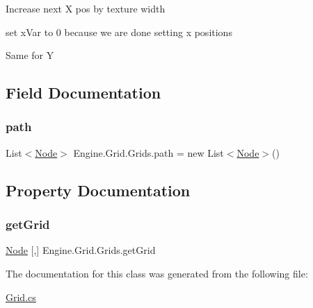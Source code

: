 Increase next X pos by texture width

set x\+Var to 0 because we are done setting x positions

Same for Y 

\subsection{Field Documentation}
\mbox{\label{a00406_ad9776283305f0c420d4a544d418a7c40}} 
\subsubsection{\texorpdfstring{path}{path}}
{\footnotesize\ttfamily List$<$\hyperlink{a00414}{Node}$>$ Engine.\+Grid.\+Grids.\+path = new List$<$\hyperlink{a00414}{Node}$>$()}



\subsection{Property Documentation}
\mbox{\label{a00406_a272de0996ab650f3dde958644d26b032}} 
\subsubsection{\texorpdfstring{get\+Grid}{getGrid}}
{\footnotesize\ttfamily \hyperlink{a00414}{Node} \mbox{[},\mbox{]} Engine.\+Grid.\+Grids.\+get\+Grid\hspace{0.3cm}{\ttfamily [get]}}



The documentation for this class was generated from the following file\+:\begin{DoxyCompactItemize}
\item 
\hyperlink{a00086}{Grid.\+cs}\end{DoxyCompactItemize}
